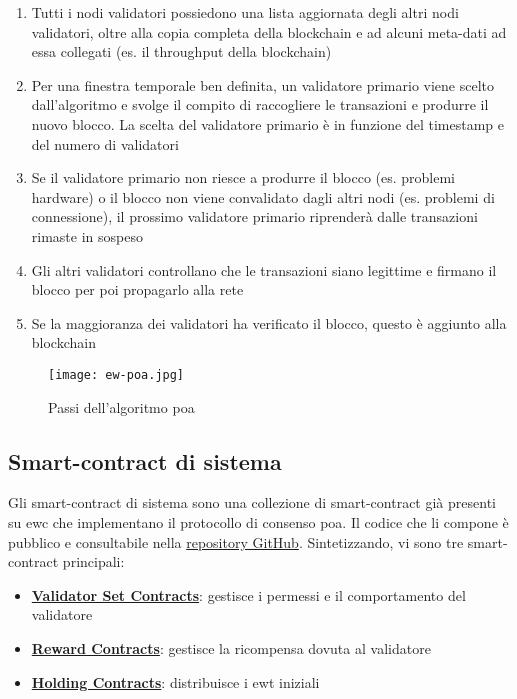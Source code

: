 \begin{enumerate}
    \item Tutti i nodi validatori possiedono una lista aggiornata degli altri nodi validatori, oltre alla copia completa della blockchain e ad alcuni meta-dati ad essa collegati (es. il throughput della blockchain)
    \item Per una finestra temporale ben definita, un validatore primario viene scelto dall'algoritmo e svolge il compito di raccogliere le transazioni e produrre il nuovo blocco. La scelta del validatore primario è in funzione del timestamp e del numero di validatori
    \item Se il validatore primario non riesce a produrre il blocco (es. problemi hardware) o il blocco non viene convalidato dagli altri nodi (es. problemi di connessione), il prossimo validatore primario riprenderà dalle transazioni rimaste in sospeso
    \item Gli altri validatori controllano che le transazioni siano legittime e firmano il blocco per poi propagarlo alla rete
    \item Se la maggioranza dei validatori ha verificato il blocco, questo è aggiunto alla blockchain
\end{enumerate}


\begin{figure}[ht]
    \texttt{[image: ew-poa.jpg]}
    \centering
    \caption{Passi dell'algoritmo \gls{poa} \cite{img:ew-poa}}
    \label{lab:ew-poa}
\end{figure}

\subsection{Smart-contract di sistema}
Gli smart-contract di sistema sono una collezione di smart-contract già presenti su \gls{ewc} che implementano il protocollo di consenso \gls{poa}.
Il codice che li compone è pubblico e consultabile nella \href{https://github.com/energywebfoundation/ewc-system-contracts}{repository GitHub}.
Sintetizzando, vi sono tre smart-contract principali:

\begin{itemize}
    \item \href{https://energy-web-foundation.gitbook.io/energy-web/technology/the-stack/trust-layer-energy-web-chain/system-architecture/system-contracts/validator-set-contract#overview}{\textbf{Validator Set Contracts}}: gestisce i permessi e il comportamento del validatore
    \item \href{https://energy-web-foundation.gitbook.io/energy-web/technology/the-stack/trust-layer-energy-web-chain/system-architecture/system-contracts/block-reward-contract}{\textbf{Reward Contracts}}: gestisce la ricompensa dovuta al validatore
    \item \href{https://energy-web-foundation.gitbook.io/energy-web/technology/the-stack/trust-layer-energy-web-chain/system-architecture/system-contracts/holding-contract#overview}{\textbf{Holding Contracts}}: distribuisce i \gls{ewt} iniziali
\end{itemize}

